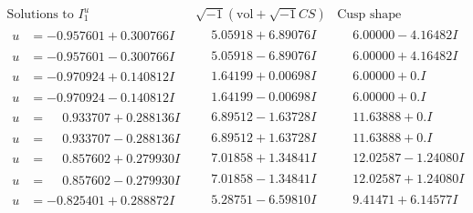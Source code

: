 \documentclass[1p]{elsarticle_modified}
\theoremstyle{definition}
\newcommand{\I}{\sqrt{-1}}
\begin{document}
$$\begin{array}{c|c|c}  
\text{Solutions to }I^u_{1}& \I (\text{vol} + \sqrt{-1}CS) & \text{Cusp shape}\\
 \hline 
\begin{aligned}
u &= -0.957601 + 0.300766 I\end{aligned}
 & \phantom{-}5.05918 + 6.89076 I & \phantom{-}6.00000 - 4.16482 I \\ \hline\begin{aligned}
u &= -0.957601 - 0.300766 I\end{aligned}
 & \phantom{-}5.05918 - 6.89076 I & \phantom{-}6.00000 + 4.16482 I \\ \hline\begin{aligned}
u &= -0.970924 + 0.140812 I\end{aligned}
 & \phantom{-}1.64199 + 0.00698 I & \phantom{-}6.00000 + 0. I\phantom{ +0.000000I} \\ \hline\begin{aligned}
u &= -0.970924 - 0.140812 I\end{aligned}
 & \phantom{-}1.64199 - 0.00698 I & \phantom{-}6.00000 + 0. I\phantom{ +0.000000I} \\ \hline\begin{aligned}
u &= \phantom{-}0.933707 + 0.288136 I\end{aligned}
 & \phantom{-}6.89512 - 1.63728 I & \phantom{-}11.63888 + 0. I\phantom{ +0.000000I} \\ \hline\begin{aligned}
u &= \phantom{-}0.933707 - 0.288136 I\end{aligned}
 & \phantom{-}6.89512 + 1.63728 I & \phantom{-}11.63888 + 0. I\phantom{ +0.000000I} \\ \hline\begin{aligned}
u &= \phantom{-}0.857602 + 0.279930 I\end{aligned}
 & \phantom{-}7.01858 + 1.34841 I & \phantom{-}12.02587 - 1.24080 I \\ \hline\begin{aligned}
u &= \phantom{-}0.857602 - 0.279930 I\end{aligned}
 & \phantom{-}7.01858 - 1.34841 I & \phantom{-}12.02587 + 1.24080 I \\ \hline\begin{aligned}
u &= -0.825401 + 0.288872 I\end{aligned}
 & \phantom{-}5.28751 - 6.59810 I & \phantom{-}9.41471 + 6.14577 I \\ \hline\begin{aligned}

\end{aligned}
\end{array}$$
\end{document}
